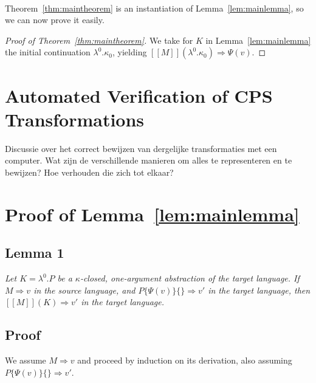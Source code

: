 \documentclass[a4paper,11pt,draft]{article}
\begin{document}
\paragraph{}

Theorem~\ref{thm:maintheorem} is an instantiation of
Lemma~\ref{lem:mainlemma}, so we can now prove it easily.

\begin{proof}[Proof of Theorem~\ref{thm:maintheorem}]
We take for $K$ in Lemma~\ref{lem:mainlemma} the initial continuation
$\lambda^{0}.\kappa_{0}$, yielding
$[\![M]\!] (\lambda^{0}.\kappa_{0}) \Rightarrow \Psi(v)$.
\end{proof}


\section{Automated Verification of CPS Transformations}\label{sec:automated}

Discussie over het correct bewijzen van dergelijke transformaties met een
computer. Wat zijn de verschillende manieren om alles te representeren en te
bewijzen? Hoe verhouden die zich tot elkaar?


\appendix


\section{Proof of Lemma~\ref{lem:mainlemma}}\label{sec:proof}

\subsection*{Lemma 1}

{\em
  Let $K = \lambda^{0}.P$ be a $\kappa$-closed, one-argument
  abstraction of the target language. If $M \Rightarrow v$ in the
  source language, and $P\{\Psi(v)\}\{\} \Rightarrow v'$ in the target
  language, then $[\![M]\!](K) \Rightarrow v'$ in the target language.
}

\subsection*{Proof}

We assume $M \Rightarrow v$ and proceed by induction on its derivation, also
assuming $P\{\Psi(v)\}\{\} \Rightarrow v'$.
\end{document}
